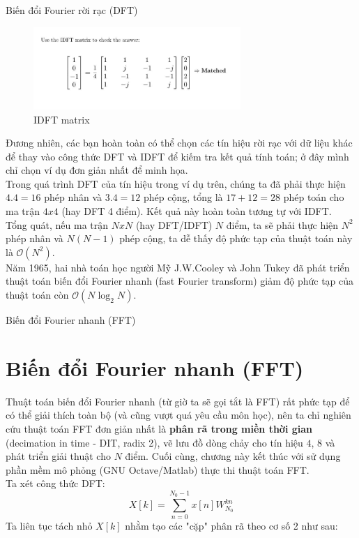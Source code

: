\documentclass[8pt]{beamer}
\begin{document}
\begin{frame}{Biến đổi Fourier rời rạc (DFT)}
\begin{figure}[h]
			\includegraphics[width=0.7\textwidth]{3.jpg}

			\caption{IDFT matrix}			\label{fig:re3}

		\end{figure}

Đương nhiên, các bạn hoàn toàn có thể chọn các tín hiệu rời rạc với dữ liệu khác để thay vào công thức DFT và IDFT để kiếm tra kết quả tính toán; ở đây mình chỉ chọn ví dụ đơn giản nhất để minh họa. 
\\ Trong quá trình DFT của tín hiệu trong ví dụ trên, chúng ta đã phải thực hiện $4.4=16$ phép nhân và $3.4=12$ phép cộng, tổng là $17+12=28$ phép toán cho ma trận $4x4$ (hay DFT 4 điểm). Kết quả này hoàn toàn tương tự với IDFT.
\\ Tổng quát, nếu ma trận $NxN$ (hay DFT/IDFT) $N$ điểm, ta sẽ phải thực hiện $N^2$ phép nhân và $N(N-1)$ phép cộng, ta dễ thấy độ phức tạp của thuật toán này là $\mathscr{O}(N^2)$.
\\ Năm 1965, hai nhà toán học người Mỹ J.W.Cooley và John Tukey đã phát triển thuật toán biến đổi Fourier nhanh (fast Fourier transform) giảm độ phức tạp của thuật toán còn $\mathscr{O}{(N\log_{2}N)}$.
\end{frame}
\begin{frame}{Biến đổi Fourier nhanh (FFT)}
	\section{Biến đổi Fourier nhanh (FFT)}
	Thuật toán biến đổi Fourier nhanh (từ giờ ta sẽ gọi tắt là FFT) rất phức tạp để có thể giải thích toàn bộ (và cũng vượt quá yêu cầu môn học), nên ta chỉ nghiên cứu thuật toán FFT đơn giản nhất là \textbf{phân rã trong miền thời gian} (decimation in time - DIT, radix 2), vẽ lưu đồ dòng chảy cho tín hiệu $4$, $8$ và phát triển giải thuật cho $N$ điểm. Cuối cùng, chương này kết thúc với sử dụng phần mềm mô phỏng (GNU Octave/Matlab) thực thi thuật toán FFT.
\\ Ta xét công thức DFT: $$X[k]=\sum_{n=0}^{N_{0}-1}x[n]W_{N_{0}}^{kn}$$
Ta liên tục tách nhỏ $X[k]$ nhằm tạo các "cặp" phân rã theo cơ số 2 như sau:
\end{frame}
\end{document}
